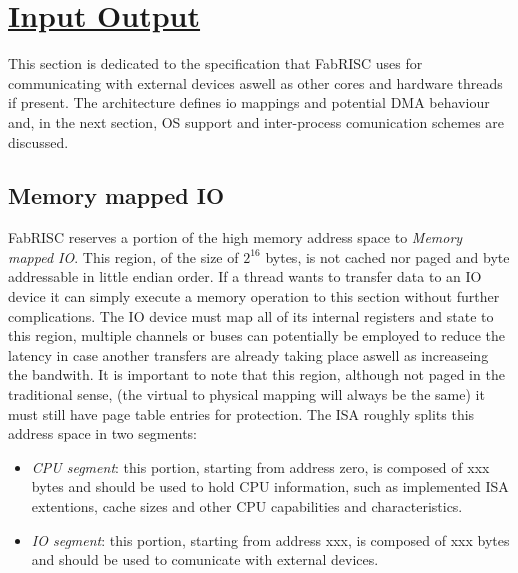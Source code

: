 \documentclass{article}
\begin{document}
    \clearpage


    \section[Input Output]{\LARGE\underline{Input Output}}

        This section is dedicated to the specification that FabRISC uses for communicating with external devices aswell as other cores and hardware threads if present. The architecture defines io mappings and potential DMA behaviour and, in the next section, OS support and inter-process comunication schemes are discussed.

        \subsection{Memory mapped IO}

            FabRISC reserves a portion of the high memory address space to \textit{Memory mapped IO}. This region, of the size of $2^{16}$ bytes, is not cached nor paged and byte addressable in little endian order. If a thread wants to transfer data to an IO device it can simply execute a memory operation to this section without further complications. The IO device must map all of its internal registers and state to this region, multiple channels or buses can potentially be employed to reduce the latency in case another transfers are already taking place aswell as increaseing the bandwith. It is important to note that this region, although not paged in the traditional sense, (the virtual to physical mapping will always be the same) it must still have page table entries for protection. The ISA roughly splits this address space in two segments:

            \begin{itemize}

                \item \textit{CPU segment}: this portion, starting from address zero, is composed of xxx bytes and should be used to hold CPU information, such as implemented ISA extentions, cache sizes and other CPU capabilities and characteristics.
                \item \textit{IO segment}: this portion, starting from address xxx, is composed of xxx bytes and should be used to comunicate with external devices.

            \end{itemize}
\end{document}
